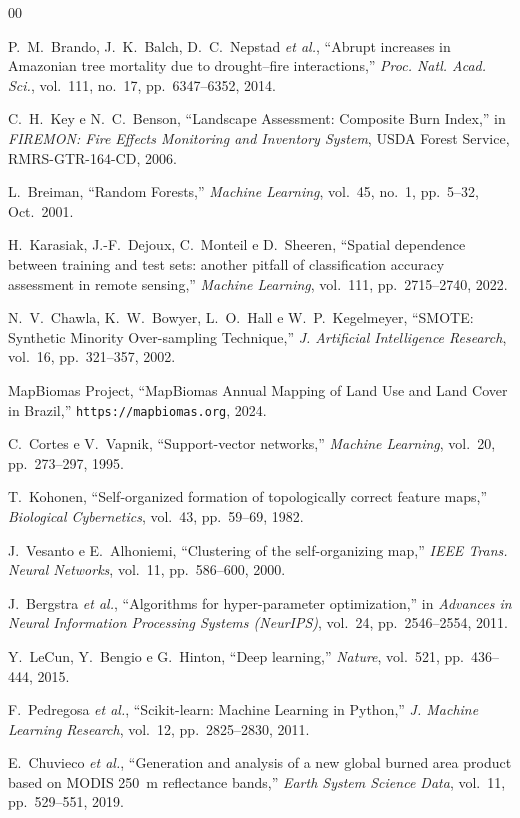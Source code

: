 \documentclass[conference]{IEEEtran}
\begin{document}
\begin{thebibliography}{00}

P.~M.~Brando, J.~K.~Balch, D.~C.~Nepstad \textit{et al.},
``Abrupt increases in Amazonian tree mortality due to drought–fire
interactions,''
\textit{Proc. Natl. Acad. Sci.}, vol.~111, no.~17, pp.~6347--6352, 2014.

C.~H.~Key e N.~C.~Benson,
``Landscape Assessment: Composite Burn Index,''
in \textit{FIREMON: Fire Effects Monitoring and Inventory System},
USDA Forest Service, RMRS-GTR-164-CD, 2006.

L.~Breiman,
``Random Forests,''
\textit{Machine Learning}, vol.~45, no.~1, pp.~5--32, Oct.\ 2001.

H.~Karasiak, J.-F.~Dejoux, C.~Monteil e D.~Sheeren,
``Spatial dependence between training and test sets: another pitfall of
classification accuracy assessment in remote sensing,''
\textit{Machine Learning}, vol.~111, pp.~2715--2740, 2022.

N.~V.~Chawla, K.~W.~Bowyer, L.~O.~Hall e W.~P.~Kegelmeyer,
``SMOTE: Synthetic Minority Over-sampling Technique,''
\textit{J. Artificial Intelligence Research}, vol.~16,
pp.~321--357, 2002.

MapBiomas Project,
``MapBiomas Annual Mapping of Land Use and Land Cover in Brazil,''
\texttt{https://mapbiomas.org}, 2024.

C.~Cortes e V.~Vapnik,
``Support-vector networks,''
\textit{Machine Learning}, vol.~20, pp.~273--297, 1995.

T.~Kohonen,
``Self-organized formation of topologically correct feature maps,''
\textit{Biological Cybernetics}, vol.~43, pp.~59--69, 1982.

J.~Vesanto e E.~Alhoniemi,
``Clustering of the self-organizing map,''
\textit{IEEE Trans. Neural Networks}, vol.~11, pp.~586--600, 2000.

J.~Bergstra \textit{et al.},
``Algorithms for hyper-parameter optimization,''
in \textit{Advances in Neural Information Processing Systems (NeurIPS)},
vol.~24, pp.~2546--2554, 2011.

Y.~LeCun, Y.~Bengio e G.~Hinton,
``Deep learning,''
\textit{Nature}, vol.~521, pp.~436--444, 2015.

F.~Pedregosa \textit{et al.},
``Scikit-learn: Machine Learning in Python,''
\textit{J. Machine Learning Research}, vol.~12, pp.~2825--2830, 2011.

E.~Chuvieco \textit{et al.},
``Generation and analysis of a new global burned area product based on
MODIS 250~m reflectance bands,''
\textit{Earth System Science Data}, vol.~11, pp.~529--551, 2019.

\end{thebibliography}
\end{document}
